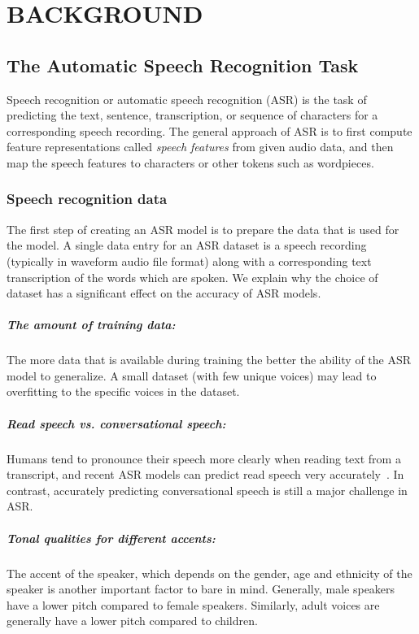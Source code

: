 \chapter{BACKGROUND}



\section{The Automatic Speech Recognition Task}\label{sec:background}
Speech recognition or automatic speech recognition (ASR) is the task of 
predicting the text, sentence, transcription, or sequence of characters 
for a corresponding speech recording.
The general approach of ASR is to first compute feature representations called \emph{speech features} from given audio data,
and then map the speech features to characters or other tokens such as wordpieces.



\subsection{Speech recognition data}
The first step of creating an ASR model is to prepare the data that is used for the model.
A single data entry for an ASR dataset is a speech recording (typically in waveform audio file format)
along with a corresponding text transcription of the words which are spoken.
We explain why the choice of dataset has a significant effect on the accuracy of ASR models.

\paragraph*{The amount of training data:} The more data that is available during training the better the ability
of the ASR model to generalize. A small dataset (with few unique voices) may lead to overfitting to the specific 
voices in the dataset.
\paragraph*{Read speech vs. conversational speech:} Humans tend to pronounce their speech more clearly 
when reading text from a transcript, and recent ASR models can predict read speech very accurately~\cite{jurafskyspeech}.
In contrast, accurately predicting conversational speech is still a major challenge in ASR.
\paragraph*{Tonal qualities for different accents:} The accent of the speaker, which depends on the gender, 
age and ethnicity of the speaker is another important factor to bare in mind. Generally, male speakers
have a lower pitch compared to female speakers. Similarly, adult voices are generally have a lower pitch
compared to children.
